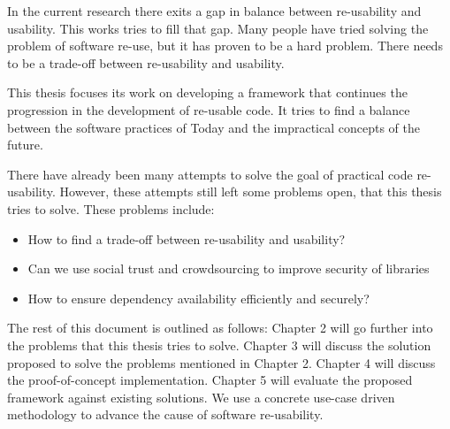 
In the current research there exits a gap in balance between re-usability and usability. This works tries to fill that gap. Many people have tried solving the problem of software re-use, but it has proven to be a hard problem. There needs to be a trade-off between re-usability and usability.

This thesis focuses its work on developing a framework that continues the progression in the development of re-usable code. It tries to find a balance between the software practices of Today and the impractical concepts of the future.

There have already been many attempts to solve the goal of practical code re-usability. However, these attempts still left some problems open, that this thesis tries to solve. These problems include:

\begin{itemize}
	\item How to find a trade-off between re-usability and usability?
	\item Can we use social trust and crowdsourcing to improve security of libraries
	\item How to ensure dependency availability efficiently and securely?
\end{itemize}


The rest of this document is outlined as follows: Chapter 2 will go further into the problems that this thesis tries to solve. Chapter 3 will discuss the solution proposed to solve the problems mentioned in Chapter 2. Chapter 4 will discuss the proof-of-concept implementation. Chapter 5 will evaluate the proposed framework against existing solutions. We use a concrete use-case driven methodology to advance the cause of software re-usability. 

